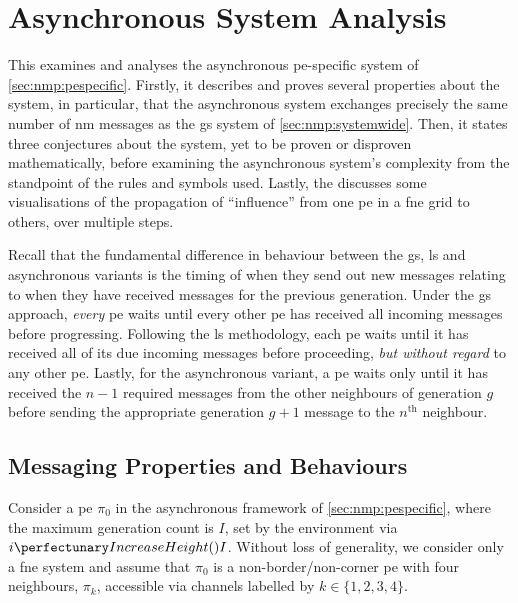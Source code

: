\section{\label{sec:nmp:analysis}Asynchronous System Analysis}

This  examines and analyses the asynchronous \gls{pe}-specific system of \cref{sec:nmp:pespecific}.  Firstly, it describes and proves several properties about the system, in particular, that the asynchronous system exchanges precisely the same number of \gls{nm} messages as the \gls{gs} system of \cref{sec:nmp:systemwide}.  Then, it states three conjectures about the system, yet to be proven or disproven mathematically, before examining the asynchronous system's complexity from the standpoint of the rules and symbols used.  Lastly, the  discusses some visualisations of the propagation of ``influence'' from one \gls{pe} in a \gls{fne} grid to others, over multiple steps.

Recall that the fundamental difference in behaviour between the \gls{gs}, \gls{ls} and asynchronous variants is the timing of when they send out new messages relating to when they have received messages for the previous generation.  Under the \gls{gs} approach, \emph{every} \gls{pe} waits until every other \gls{pe} has received all incoming messages before progressing.  Following the \gls{ls} methodology, each \gls{pe} waits until it has received all of its due incoming messages before proceeding, \emph{but without regard} to any other \gls{pe}.  Lastly, for the asynchronous variant, a \gls{pe} waits only until it has received the \(n - 1\) required messages from the other neighbours of generation \(g\) before sending the appropriate generation \(g + 1\) message to the \(n^\text{th}\) neighbour.

\subsection{\label{sec:nmp:msgprops}Messaging Properties and Behaviours}

Consider a \gls{pe} $\pi_0$ in the asynchronous framework of \cref{sec:nmp:pespecific},
where the maximum generation count is $I$, set by the environment via $\cpfunc{i}{I}$.
Without loss of generality, 
we consider only a \gls{fne} system and
assume that $\pi_0$ is a non-border/non-corner \gls{pe} with four neighbours, 
$\pi_k$, accessible via channels labelled by $k \in \{ 1, 2, 3, 4 \}$. 

